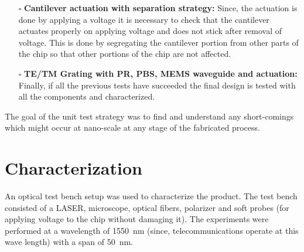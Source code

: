 \documentclass[../report.tex]{subfiles}
\begin{document}
\begin{itemize}[leftmargin=*]
		\item[$\square$] \textbf{Cantilever actuation with separation strategy:} Since, the actuation is done by applying a voltage it is necessary to check that the cantilever actuates properly on applying voltage and does not stick after removal of voltage. This is done by segregating the cantilever portion from other parts of the chip so that other portions of the chip are not affected. 
		
		\item[$\square$] \textbf{TE/TM Grating with PR, PBS, MEMS waveguide and actuation:} Finally, if all the previous tests have succeeded the final design is tested with all the components and characterized.
	\end{itemize}
	
	\noindent The goal of the unit test strategy was to find and understand any short-comings which might occur at nano-scale at any stage of the fabricated process.
	
	\section{Characterization}
	An optical test bench setup was used to characterize the product. The test bench consisted of a LASER, microscope, optical fibers, polarizer and soft probes (for applying voltage to the chip without damaging it). The experiments were performed at a wavelength of \SI{1550}{\nano \meter} (since, telecommunications operate at this wave length) with a span of \SI{50}{\nano \meter}.
	
\end{document}
